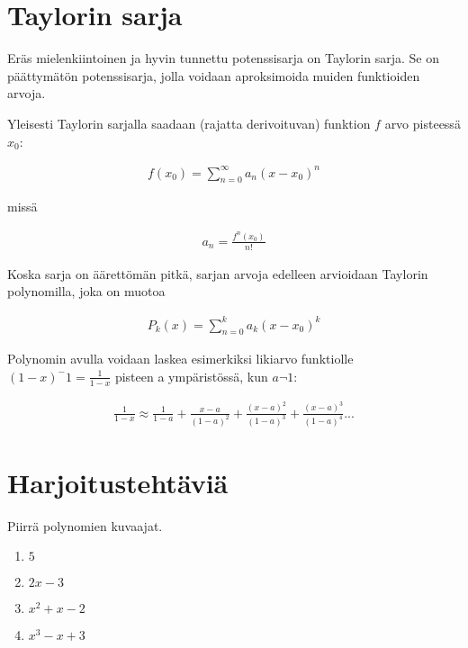\section{Taylorin sarja}
Eräs mielenkiintoinen ja hyvin tunnettu potenssisarja on Taylorin sarja.
Se on päättymätön potenssisarja, jolla voidaan aproksimoida muiden funktioiden arvoja.

Yleisesti Taylorin sarjalla saadaan (rajatta derivoituvan) funktion $f$ arvo pisteessä $x_0$:

\begin{align*}
	f(x_0) = \sum\limits_{n=0}^\infty a_n(x-x_0)^n
\end{align*}

missä

\begin{align*}
a_n = \frac{f^n(x_0)}{n!}
\end{align*}

Koska sarja on äärettömän pitkä, sarjan arvoja edelleen arvioidaan Taylorin polynomilla, joka on muotoa

\begin{align*}
	P_k(x) = \sum\limits_{n=0}^k a_k(x-x_0)^k
\end{align*}

Polynomin avulla voidaan laskea esimerkiksi likiarvo funktiolle
$(1-x)^-1 = \frac{1}{1-x}$ pisteen a ympäristössä, kun $a \neg 1$:

\begin{align*}
	\frac{1}{1-x} \approx \frac{1}{1-a} + \frac{x-a}{(1-a)^2} + \frac{(x-a)^2}{(1-a)^3} + \frac{(x-a)^3}{(1-a)^4} ...
\end{align*}


\section{Harjoitustehtäviä}
\begin{tehtava}
	Piirrä polynomien kuvaajat.
	\begin{enumerate}
		\item $5$
		\item $2x-3$
		\item $x^2+x-2$
		\item $x^3-x+3$
	\end{enumerate}

	\begin{vastaus}
	\end{vastaus}
\end{tehtava}